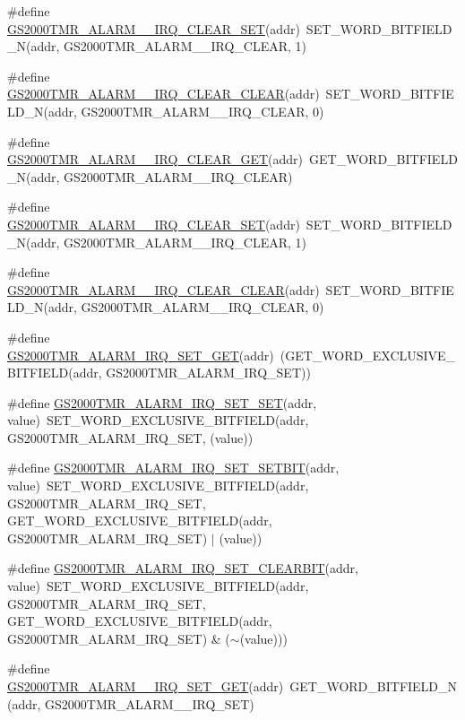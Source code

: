 \begin{DoxyCompactItemize}
\item 
\#define \hyperlink{a00555_ac90807dfc73aff3d7cdd848abcb0a03e}{GS2000TMR\_\-ALARM\_\_\-IRQ\_\-CLEAR\_\-SET}(addr)~SET\_\-WORD\_\-BITFIELD\_\-N(addr, GS2000TMR\_\-ALARM\_\_\-IRQ\_\-CLEAR, 1)
\item 
\#define \hyperlink{a00555_a1a6ac23a06300bbf5ffeab15168af1cc}{GS2000TMR\_\-ALARM\_\_\-IRQ\_\-CLEAR\_\-CLEAR}(addr)~SET\_\-WORD\_\-BITFIELD\_\-N(addr, GS2000TMR\_\-ALARM\_\_\-IRQ\_\-CLEAR, 0)
\item 
\#define \hyperlink{a00555_a6989d367fde281bc0df176053c36bc60}{GS2000TMR\_\-ALARM\_\_\-IRQ\_\-CLEAR\_\-GET}(addr)~GET\_\-WORD\_\-BITFIELD\_\-N(addr, GS2000TMR\_\-ALARM\_\_\-IRQ\_\-CLEAR)
\item 
\#define \hyperlink{a00555_a601d3cc28755dffeb8eff9df11803d2d}{GS2000TMR\_\-ALARM\_\_\-IRQ\_\-CLEAR\_\-SET}(addr)~SET\_\-WORD\_\-BITFIELD\_\-N(addr, GS2000TMR\_\-ALARM\_\_\-IRQ\_\-CLEAR, 1)
\item 
\#define \hyperlink{a00555_ab8f7e7165f1661d91152f0a965581cb4}{GS2000TMR\_\-ALARM\_\_\-IRQ\_\-CLEAR\_\-CLEAR}(addr)~SET\_\-WORD\_\-BITFIELD\_\-N(addr, GS2000TMR\_\-ALARM\_\_\-IRQ\_\-CLEAR, 0)
\item 
\#define \hyperlink{a00555_ab4f03afd96eb5936c8c87ccf87162189}{GS2000TMR\_\-ALARM\_\-IRQ\_\-SET\_\-GET}(addr)~(GET\_\-WORD\_\-EXCLUSIVE\_\-BITFIELD(addr, GS2000TMR\_\-ALARM\_\-IRQ\_\-SET))
\item 
\#define \hyperlink{a00555_aab654c90512b68a2213b7ac5ebdf9058}{GS2000TMR\_\-ALARM\_\-IRQ\_\-SET\_\-SET}(addr, value)~SET\_\-WORD\_\-EXCLUSIVE\_\-BITFIELD(addr, GS2000TMR\_\-ALARM\_\-IRQ\_\-SET, (value))
\item 
\#define \hyperlink{a00555_abdca40c470a9d857e3bbd65170bd114c}{GS2000TMR\_\-ALARM\_\-IRQ\_\-SET\_\-SETBIT}(addr, value)~SET\_\-WORD\_\-EXCLUSIVE\_\-BITFIELD(addr, GS2000TMR\_\-ALARM\_\-IRQ\_\-SET, GET\_\-WORD\_\-EXCLUSIVE\_\-BITFIELD(addr, GS2000TMR\_\-ALARM\_\-IRQ\_\-SET) $|$ (value))
\item 
\#define \hyperlink{a00555_a331d9e838a80e296e71be4e9b3792242}{GS2000TMR\_\-ALARM\_\-IRQ\_\-SET\_\-CLEARBIT}(addr, value)~SET\_\-WORD\_\-EXCLUSIVE\_\-BITFIELD(addr, GS2000TMR\_\-ALARM\_\-IRQ\_\-SET, GET\_\-WORD\_\-EXCLUSIVE\_\-BITFIELD(addr, GS2000TMR\_\-ALARM\_\-IRQ\_\-SET) \& ($\sim$(value)))
\item 
\#define \hyperlink{a00555_afa3d4c86c39820585d3cb855e5a19775}{GS2000TMR\_\-ALARM\_\_\-IRQ\_\-SET\_\-GET}(addr)~GET\_\-WORD\_\-BITFIELD\_\-N(addr, GS2000TMR\_\-ALARM\_\_\-IRQ\_\-SET)

\end{DoxyCompactItemize}
